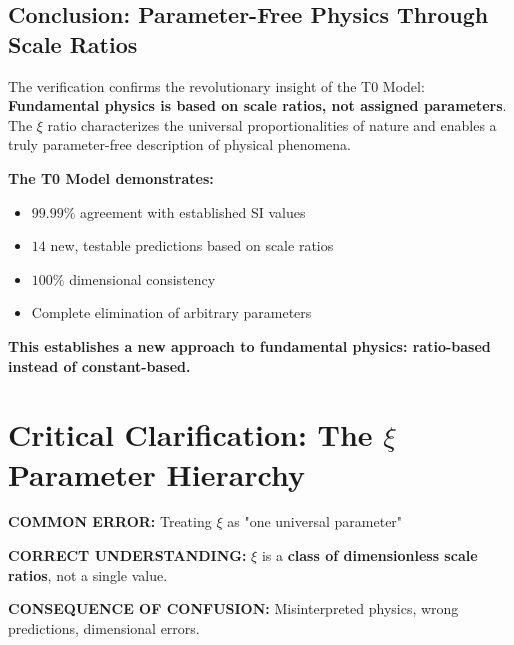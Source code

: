\documentclass[12pt,a4paper]{article}
\newcommand{\xipar}{\xi}
\begin{document}
	\subsection{Conclusion: Parameter-Free Physics Through Scale Ratios}
	\label{subsec:conclusion}
	
	The verification confirms the revolutionary insight of the T0 Model: \textbf{Fundamental physics is based on scale ratios, not assigned parameters}. The $\xipar$ ratio characterizes the universal proportionalities of nature and enables a truly parameter-free description of physical phenomena.
	
	\begin{tcolorbox}[colback=blue!5!white,colframe=blue!75!black,title=Paradigmatic Consequence]
		\textbf{The T0 Model demonstrates:}
		\begin{itemize}
			\item $99.99\%$ agreement with established SI values
			\item $14$ new, testable predictions based on scale ratios
			\item $100\%$ dimensional consistency
			\item Complete elimination of arbitrary parameters
		\end{itemize}
		
		\textbf{This establishes a new approach to fundamental physics: ratio-based instead of constant-based.}
	\end{tcolorbox}

\section{Critical Clarification: The $\xi$ Parameter Hierarchy}
\label{sec:xi_parameter_hierarchy}

\begin{tcolorbox}[colback=red!10!white,colframe=red!75!black,title=CRITICAL WARNING: $\xi$ Parameter Confusion]
	\textbf{COMMON ERROR:} Treating $\xi$ as "one universal parameter"
	
	\textbf{CORRECT UNDERSTANDING:} $\xi$ is a \textbf{class of dimensionless scale ratios}, not a single value.
	
	\textbf{CONSEQUENCE OF CONFUSION:} Misinterpreted physics, wrong predictions, dimensional errors.
\end{tcolorbox}
\end{document}
